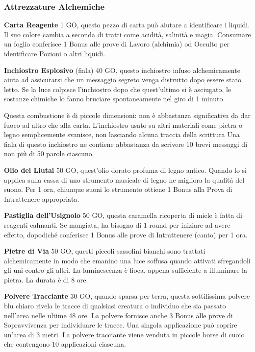 \documentclass[12pt,a4paper,twoside,openany]{book}
\begin{document}
\begin{multicols}{2}
\subsubsection{Attrezzature Alchemiche}

\textbf{Carta Reagente} 1 GO, questo pezzo di carta può aiutare a identificare i liquidi. Il suo colore cambia a seconda di tratti come acidità, salinità e magia. Consumare un foglio conferisce 1 Bonus alle prove di Lavoro (alchimia) od Occulto per identificare Pozioni o altri liquidi.

\textbf{Inchiostro Esplosivo} (fiala) 40 GO, questo inchiostro infuso alchemicamente aiuta ad assicurarsi che un messaggio segreto venga distrutto dopo essere stato letto. Se la luce colpisce l'inchiostro dopo che quest'ultimo si è asciugato, le sostanze chimiche lo fanno bruciare spontaneamente nel giro di 1 minuto

Questa combustione è di piccole dimensioni: non è abbastanza significativa da dar fuoco ad altro che alla carta. L'inchiostro usato su altri materiali come pietra o legno semplicemente svanisce, non lasciando alcuna traccia della scrittura
Una fiala di questo inchiostro ne contiene abbastanza da scrivere 10 brevi messaggi di non più di 50 parole ciascuno.

\textbf{Olio dei Liutai} 50 GO, quest'olio dorato profuma di legno antico. Quando lo si applica sulla cassa di uno strumento musicale di legno ne migliora la qualità del suono. Per 1 ora, chiunque suoni lo strumento ottiene 1 Bonus alla Prova di Intrattenere appropriata.

\textbf{Pastiglia dell'Usignolo} 50 GO, questa caramella ricoperta di miele è fatta di reagenti calmanti. Se mangiata, ha bisogno di 1 round per iniziare ad avere effetto, dopodiché conferisce 1 Bonus alle prove di Intrattenere (canto) per 1 ora.

\textbf{Pietre di Via} 50 GO, questi piccoli sassolini bianchi sono trattati alchemicamente in modo che emanino una luce soffusa quando attivati sfregandoli gli uni contro gli altri. La luminescenza è fioca, appena sufficiente a illuminare la pietra. La durata è di 8 ore.

\textbf{Polvere Tracciante} 30 GO, quando sparsa per terra, questa sottilissima polvere blu chiaro rivela le tracce di qualsiasi creatura o individuo che sia passato nell'area nelle ultime 48 ore.
La polvere fornisce anche 3 Bonus alle prove di Sopravvivenza per individuare le tracce. Una singola applicazione può coprire un'area di 3 metri. La polvere tracciante viene venduta in piccole borse di cuoio che contengono 10 applicazioni ciascuna.


\end{multicols}
\end{document}
